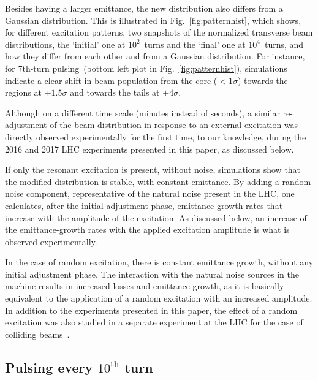 \documentclass[%
 reprint,
 amsmath,amssymb,
 aps,
prstab,
longbibliography
]{revtex4-1}
\newcommand{\seventhtp}{7th-turn pulsing}
\begin{document}
Besides having a larger emittance, the new distribution also differs
from a Gaussian distribution.  This is illustrated in
Fig.~\ref{fig:patternhist}, which shows, for different excitation
patterns, two snapshots of the normalized transverse beam
distributions, the `initial' one at $10^2$~turns and the `final' one
at $10^4$~turns, and how they differ from each other and from a
Gaussian distribution. For instance, for \seventhtp\ (bottom left plot
in Fig.~\ref{fig:patternhist}), simulations indicate a clear shift in
beam population from the core ($< 1\sigma$) towards the regions at
$\pm 1.5\sigma$ and towards the tails at $\pm 4\sigma$.

Although on a different time scale (minutes instead of seconds), a
similar re-adjustment of the beam distribution in response to an
external excitation was directly observed experimentally for the first
time, to our knowledge, during the 2016 and 2017 LHC experiments
presented in this paper, as discussed below.

If only the resonant excitation is present, without noise, simulations
show that the modified distribution is stable, with constant
emittance. By adding a random noise component, representative of the
natural noise present in the LHC, one calculates, after the initial
adjustment phase, emittance-growth rates that increase with the
amplitude of the excitation. As discussed below, an increase of the
emittance-growth rates with the applied excitation amplitude is what
is observed experimentally.

In the case of random excitation, there is constant emittance growth,
without any initial adjustment phase. The interaction with the natural
noise sources in the machine results in increased losses and emittance
growth, as it is basically equivalent to the application of a random
excitation with an increased amplitude. In addition to the experiments
presented in this paper, the effect of a random excitation was also
studied in a separate experiment at the LHC for the case of colliding
beams~\cite{md1433_noise_top_energy, md_noise_bbLHC}.


\subsection{Pulsing every $10^{\mathrm{th}}$ turn}
\label{sec:simex10}
\end{document}
